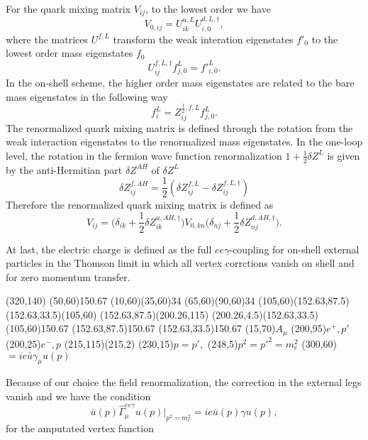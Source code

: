 For the quark mixing matrix $V_{ij}$, to the lowest order we have
\begin{equation}
V_{0,ij}=U^{u,L}_{ik}U^{d,L,\dagger}_{i,0},
\end{equation}
where the matrices $U^{f,L}$ transform the weak interation eigenstates $f'_0$ to the lowest order mass eigenstates $f_0$
\begin{equation}
U^{f,L,\dagger}_{ij}f^L_{j,0}=f'^L_{i,0}.
\end{equation}
In the on-shell scheme, the higher order mass eigenstates are related to the bare mass eigenstates in the following way
\begin{equation}
f_i^L=Z^{\frac{1}{2},f,L}_{ij}f^L_{j,0}.
\end{equation}
The renormalized quark mixing matrix is defined through the rotation from the weak interaction eigenstates to the renormalized mass eigenstates. In the one-loop level, the rotation in the fermion wave function renormalization $1+\frac{1}{2}\delta Z^L$ is given by the anti-Hermitian part $\delta Z^{AH}$ of $\delta Z^L$
\begin{equation}
\delta Z^{f,AH}_{ij}=\frac{1}{2}(\delta Z^{f,L}_{ij}-\delta Z^{f,L,\dagger}_{ij})
\end{equation} 
Therefore the renormalized quark mixing matrix is defined as
\begin{equation}
V_{ij}=\biggl(\delta_{ik}+\frac{1}{2}\delta Z^{u,AH,\dagger}_{ik}\biggr)V_{0,kn}\biggl(\delta_{nj}+\frac{1}{2}\delta Z^{d,AH,\dagger}_{nj}\biggr).
\end{equation}

At last, the electric charge is defined as the full $ee\gamma$-coupling for on-shell external particles in the Thomson limit in which all vertex corrctions vanish on shell and for zero momentum transfer.

\begin{axopicture}(320,140)
	\GCirc(50,60){15}{0.67}
	\Photon(10,60)(35,60){3}{4}
	\Photon(65,60)(90,60){3}{4}
	\Line[arrow](105,60)(152.63,87.5)
	\Line[arrow](152.63,33.5)(105,60)
	\Line[arrow](152.63,87.5)(200.26,115)
	\Line[arrow](200.26,4.5)(152.63,33.5)
	\GCirc(105,60){15}{0.67}
	\GCirc(152.63,87.5){15}{0.67}
	\GCirc(152.63,33.5){15}{0.67}
	\Text(15,70){$A_\mu$}
	\Text(200,95){$e^+,p'$}
	\Text(200,25){$e^-,p$}
	\Line(215,115)(215,2)
	\Text(230,15){$p=p',$}
	\Text(248,5){$p^2=p'^2=m_e^2$}
	\Text(300,60){$=ie\bar{u}\gamma_\mu u(p)$}
\end{axopicture}

Because of our choice the field renormalization, the correction in the external legs vanish and we have the condition
\begin{equation}
\bar{u}(p)\hat{\Gamma}^{ee\gamma}_\mu u(p)|_{p^2=m_e^2}=ie\bar{u}(p)\gamma u(p),
\end{equation}
for the amputated vertex function

